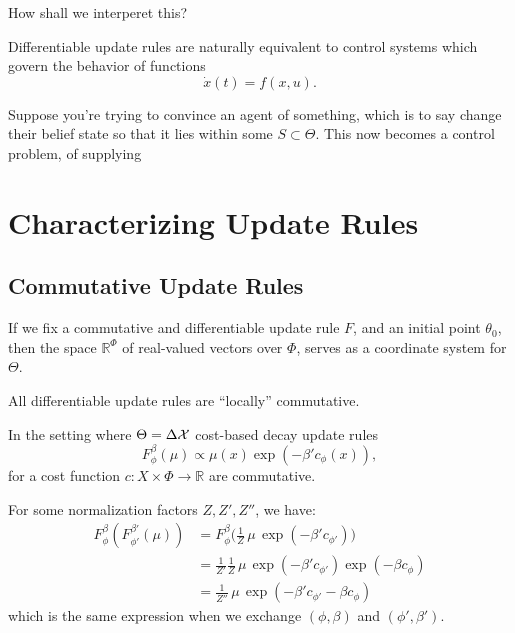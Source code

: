 \documentclass{article}
\begin{document}
How shall we interperet this?


\begin{prop}
    Differentiable update rules are naturally equivalent to control systems
    which govern the behavior of functions
    \[
        \dot x(t) = f(x, u).
    \]
\end{prop}


Suppose you're trying to convince an agent of something, which is to say change their belief state so that it lies within some $S \subset \Theta$. 
This now becomes a control problem, of supplying 


\section{Characterizing Update Rules}

\subsection{Commutative Update Rules}

If we fix a commutative and differentiable update rule $F$, and an initial point $\theta_0$, then the space $\mathbb R^\Phi$ of real-valued vectors over $\Phi$,
serves as a coordinate system for $\Theta$.


\begin{prop}
\end{prop}


\begin{prop}
    All differentiable update rules are ``locally'' commutative.
\end{prop}

\begin{prop}
    In the setting where $\Theta = \Delta\mathcal X$ 
    cost-based decay update rules 
    \[
        F^{\beta}_\phi(\mu) \propto \mu(x) \exp(- \beta' c_{\phi}(x)),
    \]
    for a cost function $c : X \times \Phi \to \mathbb R$
    are commutative.
\end{prop}
\begin{lproof}
    For some normalization factors $Z, Z', Z''$, we have:
    \begin{align*}
         F^\beta_\phi( F^{\beta'}_{\phi'}(\mu))
         &= F^\beta_\phi \Big( \frac{1}{Z} \,\mu\, \exp(- \beta' c_{\phi'}) \Big) \\
         &= \frac{1}{Z'} \frac{1}{Z} \,\mu\, \exp(- \beta' c_{\phi'}) \exp(- \beta c_{\phi}) \\
         &= \frac{1}{Z''} \,\mu\, \exp(-\beta' c_{\phi'} - \beta c_\phi)
    \end{align*}
    which is the same expression when we exchange $(\phi, \beta)$ and $(\phi', \beta')$.
\end{lproof}
\end{document}
